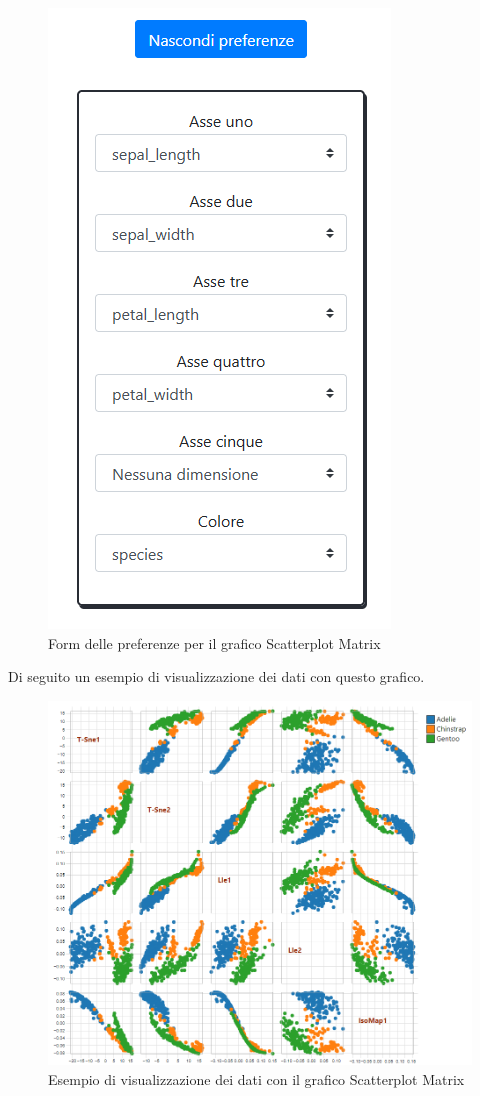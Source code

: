 \begin{figure}[H]
		\includegraphics[scale=0.7]{Images/spmp.png}
		\centering
		\caption{Form delle preferenze per il grafico Scatterplot Matrix}
\end{figure}

\newpage
Di seguito un esempio di visualizzazione dei dati con questo grafico.

\begin{figure}[H]
		\includegraphics[scale=0.6]{Images/ScatterplotMatrix.png}
		\centering
		\caption{Esempio di visualizzazione dei dati con il grafico Scatterplot Matrix}
\end{figure}

